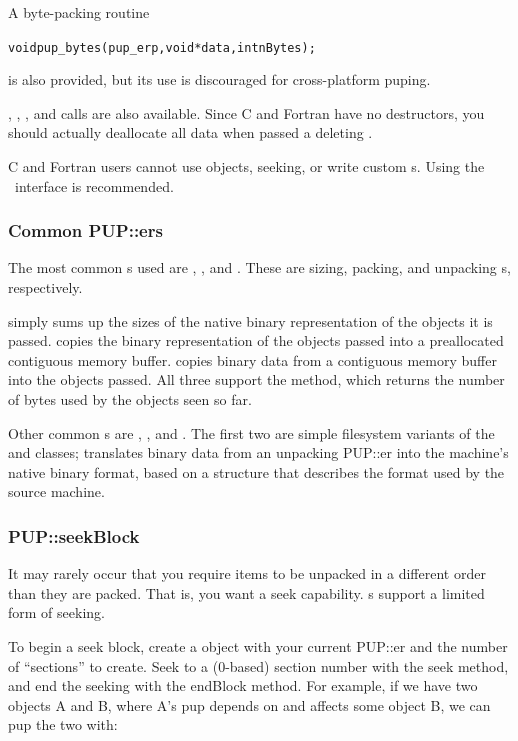 A byte-packing routine
\begin{alltt}
void pup\_bytes(pup\_er p,void *data,int nBytes);
\end{alltt}
is also provided, but its use is discouraged
for cross-platform puping.

, , ,
and  calls are also available.
Since C and Fortran have no destructors, you should 
actually deallocate all data when passed a deleting .

C and Fortran users cannot use  objects, 
seeking, or write custom s. Using the \CC\
interface is recommended.



\subsubsection{Common PUP::ers}
The most common s used are ,
, and .  These are sizing,
packing, and unpacking s, respectively.

 simply sums up the sizes of the native
binary representation of the objects it is passed.
 copies the binary representation of the
objects passed into a preallocated contiguous memory buffer.
 copies binary data from a contiguous memory
buffer into the objects passed.  All three support the
 method, which returns the number of bytes used
by the objects seen so far.

Other common s are , 
, and .  The first
two are simple filesystem variants of the  
and  classes;  translates
binary data from an unpacking PUP::er into the machine's
native binary format, based on a  structure
that describes the format used by the source machine.


\subsubsection{PUP::seekBlock}
It may rarely occur that you require items to be unpacked
in a different order than they are packed.  That is, you
want a seek capability.  s support a limited 
form of seeking.

To begin a seek block, create a  object
with your current PUP::er and the number of ``sections'' to 
create.  Seek to a (0-based) section number
with the seek method, and end the seeking with the endBlock method.
For example, if we have two objects A and B, where A's pup
depends on and affects some object B, we can pup the two with:

